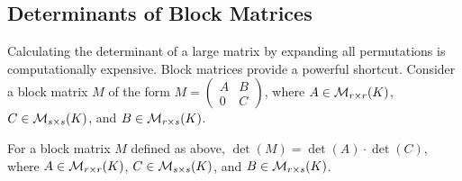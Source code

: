 \subsection{Determinants of Block Matrices}

Calculating the determinant of a large matrix by expanding all permutations is computationally expensive. Block matrices provide a powerful shortcut. Consider a block matrix $M$ of the form $M = \left(\begin{smallmatrix} A & B \\ 0 & C \end{smallmatrix}\right)$, where $A \in \mathcal{M}_{r \times r}(K)$, $C \in \mathcal{M}_{s \times s}(K)$, and $B \in \mathcal{M}_{r \times s}(K)$.

\begin{proposition}
  \label{prop:block_matrix}
  For a block matrix $M$ defined as above, $\det(M) = \det(A) \cdot \det(C)$, where $A \in \mathcal{M}_{r \times r}(K)$, $C \in \mathcal{M}_{s \times s}(K)$, and $B \in \mathcal{M}_{r \times s}(K)$.
\end{proposition}

